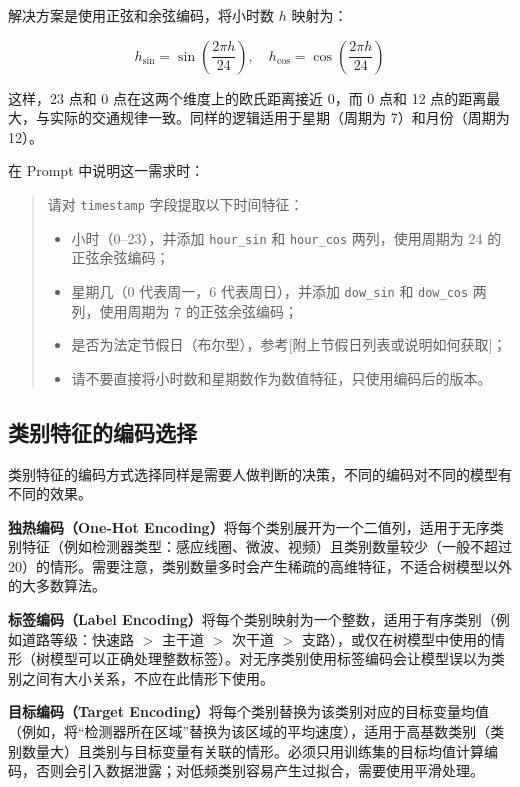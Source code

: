 解决方案是使用正弦和余弦编码，将小时数 $h$ 映射为：

\[
  h_{\sin} = \sin\!\left(\frac{2\pi h}{24}\right), \quad h_{\cos} = \cos\!\left(\frac{2\pi h}{24}\right)
\]

这样，23 点和 0 点在这两个维度上的欧氏距离接近 0，而 0 点和 12 点的距离最大，与实际的交通规律一致。同样的逻辑适用于星期（周期为 7）和月份（周期为 12）。

在 Prompt 中说明这一需求时：

\begin{quote}
请对 \texttt{timestamp} 字段提取以下时间特征：

\begin{itemize}
  \item 小时（0--23），并添加 \texttt{hour\_sin} 和 \texttt{hour\_cos} 两列，使用周期为 24 的正弦余弦编码；
  \item 星期几（0 代表周一，6 代表周日），并添加 \texttt{dow\_sin} 和 \texttt{dow\_cos} 两列，使用周期为 7 的正弦余弦编码；
  \item 是否为法定节假日（布尔型），参考[附上节假日列表或说明如何获取]；
  \item 请不要直接将小时数和星期数作为数值特征，只使用编码后的版本。
\end{itemize}
\end{quote}

\subsection{类别特征的编码选择}

类别特征的编码方式选择同样是需要人做判断的决策，不同的编码对不同的模型有不同的效果。

\textbf{独热编码（One-Hot Encoding）}将每个类别展开为一个二值列，适用于无序类别特征（例如检测器类型：感应线圈、微波、视频）且类别数量较少（一般不超过 20）的情形。需要注意，类别数量多时会产生稀疏的高维特征，不适合树模型以外的大多数算法。

\textbf{标签编码（Label Encoding）}将每个类别映射为一个整数，适用于有序类别（例如道路等级：快速路 $>$ 主干道 $>$ 次干道 $>$ 支路），或仅在树模型中使用的情形（树模型可以正确处理整数标签）。对无序类别使用标签编码会让模型误以为类别之间有大小关系，不应在此情形下使用。

\textbf{目标编码（Target Encoding）}将每个类别替换为该类别对应的目标变量均值（例如，将“检测器所在区域”替换为该区域的平均速度），适用于高基数类别（类别数量大）且类别与目标变量有关联的情形。必须只用训练集的目标均值计算编码，否则会引入数据泄露；对低频类别容易产生过拟合，需要使用平滑处理。

